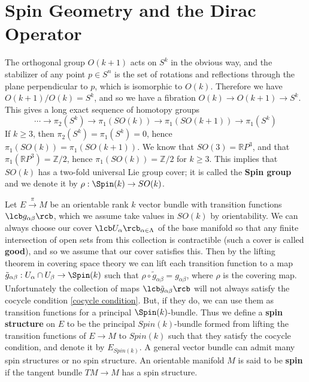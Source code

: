 \unfinished









\section{Spin Geometry and the Dirac Operator}


The orthogonal group $O(k+1)$ acts on $S^k$ in the obvious way, and the stabilizer of any point $p \in S^n$ is the set of rotations and reflections through the plane perpendicular to $p$, which is isomorphic to $O(k)$. Therefore we have $O(k+1)/O(k) = S^k$, and so we have a fibration $O(k) \rightarrow O(k+1) \rightarrow S^k$. This gives a long exact sequence of homotopy groups
\[ \cdots \longrightarrow \pi_2(S^k) \longrightarrow \pi_1(SO(k)) \longrightarrow \pi_1(SO(k+1)) \longrightarrow \pi_1(S^k) \]
If $k \geq 3$, then $\pi_2(S^k) = \pi_1(S^k) = 0$, hence $\pi_1(SO(k)) = \pi_1(SO(k+1))$. We know that $SO(3) = \mathbb RP^3$, and that $\pi_1(\mathbb RP^3) = \mathbb Z/2$, hence $\pi_1(SO(k)) = \mathbb Z/2$ for $k \geq 3$. This implies that $SO(k)$ has a two-fold universal Lie group cover; it is called the \textbf{Spin group} and we denote it by $\rho : \Spin(k) \rightarrow SO(k)$. 

Let $E \stackrel{\pi}{\rightarrow} M$ be an orientable rank $k$ vector bundle with transition functions $\lcb g_{\alpha\beta} \rcb$, which we assume take values in $SO(k)$ by orientability. We can always choose our cover $\lcb U_\alpha \rcb_{\alpha \in \Lambda}$ of the base manifold so that any finite intersection of open sets from this collection is contractible (such a cover is called \textbf{good}), and so we assume that our cover satisfies this. Then by the lifting theorem in covering space theory we can lift each transition function to a map $\tilde{g}_{\alpha\beta} : U_\alpha \cap U_\beta \rightarrow \Spin(k)$ such that $\rho \circ \tilde{g}_{\alpha\beta} = g_{\alpha\beta}$, where $\rho$ is the covering map. Unfortunately the collection of maps $\lcb \tilde{g}_{\alpha\beta} \rcb$ will not always satisfy the cocycle condition \ref{cocycle condition}. But, if they do, we can use them as transition functions for a principal $\Spin(k)$-bundle. Thus we define a \textbf{spin structure} on $E$ to be the principal $Spin(k)$-bundle formed from lifting the transition functions of $E \rightarrow M$ to $Spin(k)$ such that they satisfy the cocycle condition, and denote it by $E_{Spin(k)}$. A general vector bundle can admit many spin structures or no spin structure. An orientable manifold $M$ is said to be \textbf{spin} if the tangent bundle $TM \rightarrow M$ has a spin structure. 

